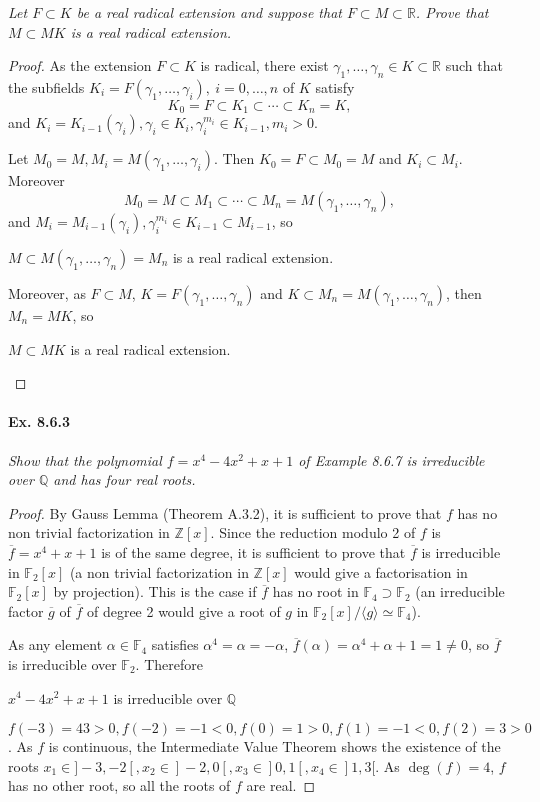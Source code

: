 \documentclass[11pt,a4paper]{article}
\newcommand{\Q}{\mathbb{Q}}
\newcommand{\Z}{\mathbb{Z}}
\newcommand{\R}{\mathbb{R}}
\newcommand{\F}{\mathbb{F}}
\begin{document}
{\it Let $F\subset K$ be a real radical extension and suppose that $F \subset M \subset \R$. Prove that $M\subset MK$ is a real radical extension.
}

\begin{proof}
As the extension $F\subset K$ is radical, there exist  $\gamma_1, \ldots,\gamma_n \in K\subset \R$ such that the subfields  $K_i = F(\gamma_1,\ldots,\gamma_i),\ i=0,\ldots,n$ of $K$ satisfy
$$K_0 = F \subset K_1 \subset \cdots \subset K_n = K,$$
and $K_i = K_{i-1}(\gamma_i), \gamma_i \in K_i, \gamma_i^{m_i} \in K_{i-1}, m_i>0$.

Let $M_0 = M, M_i = M(\gamma_1,\ldots, \gamma_i)$. Then $K_0=F  \subset M_0 = M$ and $K_i \subset M_i$. Moreover
$$M_0 = M \subset M_1\subset\cdots\subset M_n = M(\gamma_1,\ldots,\gamma_n),$$
and $M_i = M_{i-1}(\gamma_i), \gamma_i^{m_i} \in K_{i-1} \subset M_{i-1}$, so 
\begin{center}
$M \subset M(\gamma_1,\ldots,\gamma_n) = M_n$ is a real radical extension.
\end{center}
Moreover, as $F \subset M$, $K = F(\gamma_1,\ldots,\gamma_n)$ and $K \subset M_n = M(\gamma_1,\ldots,\gamma_n)$, then $M_n = MK$, so
\begin{center}
$M \subset MK$ is a real radical extension.
\end{center}
\end{proof}

\paragraph{Ex. 8.6.3}

{\it Show that the polynomial $f = x^4 -4x^2 +x + 1$ of Example 8.6.7 is irreducible over $\Q$ and has four real roots.
}

\begin{proof}
By Gauss Lemma (Theorem A.3.2), it is sufficient to prove that $f$ has no non trivial factorization in $\Z[x]$. Since the reduction modulo 2 of $f$ is $\overline{f} = x^4 +x+1$ is of the same degree, it is sufficient to prove that $\overline{f}$ is irreducible in $\F_2[x]$ (a non trivial factorization in $\Z[x]$ would give a factorisation in $\F_2[x]$ by projection). This is the case if $\overline{f}$ has no root in  $\F_4 \supset \F_2$ (an irreducible factor  $\overline{g}$ of $\overline{f}$ of degree 2 would give a root of $g$ in $\F_2[x]/\langle g \rangle \simeq \F_4$).

As any element $\alpha \in \F_4$ satisfies $\alpha^4 = \alpha = -\alpha$, $\overline{f}(\alpha) = \alpha^4+\alpha +1 = 1 \ne 0$, so $\overline{f}$ is irreducible over $\F_2$.
Therefore
\begin{center}
 $x^4 -4x^2 +x + 1$ is irreducible over $\Q$
\end{center}

\bigskip

$f(-3) = 43>0, f(-2) = -1<0,f(0) = 1>0, f(1) = -1<0, f(2) = 3>0$. As $f$ is continuous, the Intermediate Value Theorem shows the existence of the roots $x_1 \in ]-3,-2[, x_2 \in ]-2,0[, x_3 \in ]0,1[, x_4 \in ]1,3[$. As $\deg(f) = 4$, $f$ has no other root, so all the roots of $f$ are real.
\end{proof}
\end{document}
